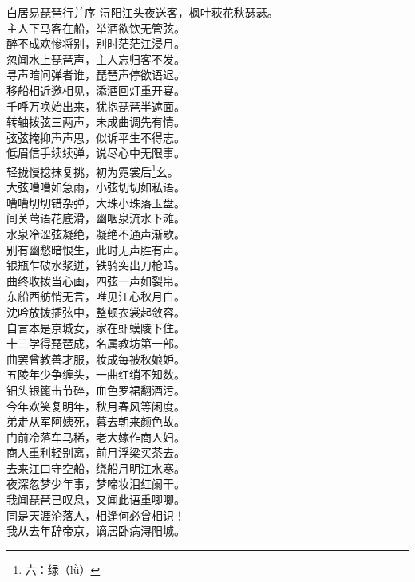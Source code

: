 \documentclass[12pt,oneside,a5paper]{book}
\begin{document}
\begin{poemzh}{白居易}{琵琶行并序}
浔阳江头夜送客，枫叶荻花秋瑟瑟。\\
主人下马客在船，举酒欲饮无管弦。\\
醉不成欢惨将别，别时茫茫江浸月。\\
忽闻水上琵琶声，主人忘归客不发。\\
寻声暗问弹者谁，琵琶声停欲语迟。\\
移船相近邀相见，添酒回灯重开宴。\\
千呼万唤始出来，犹抱琵琶半遮面。\\
转轴拨弦三两声，未成曲调先有情。\\
弦弦掩抑声声思，似诉平生不得志。\\
低眉信手续续弹，说尽心中无限事。\\
轻拢慢捻抹复挑，初为霓裳后\footnote{六：绿（lǜ）}幺。\\
大弦嘈嘈如急雨，小弦切切如私语。\\
嘈嘈切切错杂弹，大珠小珠落玉盘。\\
间关莺语花底滑，幽咽泉流水下滩。\\
水泉冷涩弦凝绝，凝绝不通声渐歇。\\
别有幽愁暗恨生，此时无声胜有声。\\
银瓶乍破水浆迸，铁骑突出刀枪鸣。\\
曲终收拨当心画，四弦一声如裂帛。\\
东船西舫悄无言，唯见江心秋月白。\\
沈吟放拨插弦中，整顿衣裳起敛容。\\
自言本是京城女，家在虾蟆陵下住。\\
十三学得琵琶成，名属教坊第一部。\\
曲罢曾教善才服，妆成每被秋娘妒。\\
五陵年少争缠头，一曲红绡不知数。\\
钿头银篦击节碎，血色罗裙翻酒污。\\
今年欢笑复明年，秋月春风等闲度。\\
弟走从军阿姨死，暮去朝来颜色故。\\
门前冷落车马稀，老大嫁作商人妇。\\
商人重利轻别离，前月浮梁买茶去。\\
去来江口守空船，绕船月明江水寒。\\
夜深忽梦少年事，梦啼妆泪红阑干。\\
我闻琵琶已叹息，又闻此语重唧唧。\\
同是天涯沦落人，相逢何必曾相识！\\
我从去年辞帝京，谪居卧病浔阳城。\\

\end{poemzh}
\end{document}
